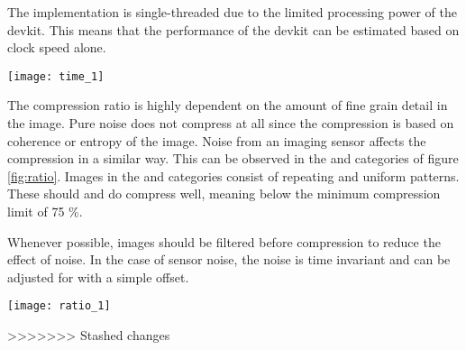 \documentclass[12pt, a4paper]{article}
\begin{document}
\medskip
\noindent
The implementation is single-threaded due to the limited processing power of the devkit. 
This means that the performance of the devkit can be estimated based on clock speed alone.

\begin{minipage}{\textwidth}
\centering
\medskip
\texttt{[image: time\_1]}
\label{fig:time}
\bigskip
\end{minipage}

\newpage
\noindent
The compression ratio is highly dependent on the amount of fine grain detail in the image. 
Pure noise does not compress at all since the compression is based on coherence or entropy of the image. 
Noise from an imaging sensor affects the compression in a similar way. 
This can be observed in the  and  categories of figure \ref{fig:ratio}. 
Images in the  and  categories consist of repeating and uniform patterns. 
These should and do compress well, meaning below the minimum compression limit of 75 \%.

\medskip
\noindent Whenever possible, images should be filtered before compression to reduce the effect of noise. 
In the case of sensor noise, the noise is time invariant and can be adjusted for with a simple offset.

\begin{minipage}{\textwidth}
\centering
\medskip
\texttt{[image: ratio\_1]}
\label{fig:ratio}
\bigskip
\end{minipage}

>>>>>>> Stashed changes
\end{document}
